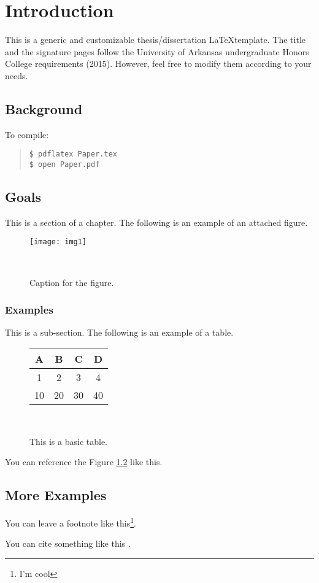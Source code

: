 \chapter{Introduction}

  This is a generic and customizable thesis/dissertation \LaTeX template. The title and the signature pages follow the University of Arkansas undergraduate Honors College requirements (2015). However, feel free to modify them according to your needs.

\section{Background}

To compile:

\begin{quote}
  \begin{Verbatim}
$ pdflatex Paper.tex
$ open Paper.pdf
  \end{Verbatim}
\end{quote}  

\section{Goals}

This is a section of a chapter. The following is an example of an attached figure.

\begin{figure}[H]
\centering
    \texttt{[image: img1]}
    \caption{Caption for the figure.}~\label{fig:mona_lisa}
\end{figure}


\subsection{Examples}

This is a sub-section. The following is an example of a table.

\begin{figure}[H]
\centering
\singlespacing
\begin{tabular}{c c c c}
  A & B & C & D \\
  \hline
  1 & 2 & 3 & 4 \\  
  10 & 20 & 30 & 40 \\
\end{tabular}
\caption{This is a basic table.}~\label{fig:tab_1}
\end{figure}

You can reference the Figure \ref{fig:tab_1} like this.

\section{More Examples}

You can leave a footnote like this\footnote{I'm cool}.

\noindent 
You can cite something like this \cite{einstein}.
